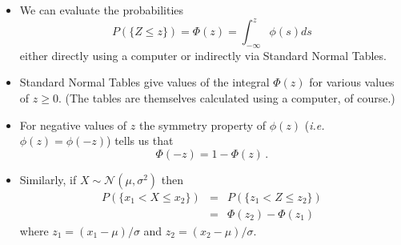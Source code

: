 \documentclass[notes=show,smaller,handout]{beamer}\usepackage[]{graphicx}\usepackage[]{color}
\renewcommand{\Pr}{P}
\newcommand{\N}{\mathcal{N}}
\newenvironment{stepitemize}{\begin{itemize}[<+->]}{\end{itemize} }
\begin{document}
\begin{frame}{\subsecname}


\begin{stepitemize}
\item We can evaluate the probabilities
$$
\Pr(\{Z\leq z\})=\Phi(z)=\int_{-\infty}^z\phi(s)ds
$$
either directly using a computer or indirectly via Standard Normal
Tables.
\item Standard Normal Tables give values of the integral $\Phi(z)$ for various values of $z\geq 0$. (The tables are themselves
calculated using a computer, of course.)
\item For negative values of $z$ the symmetry property of $\phi(z)$ (\textit{i.e.} $\phi(z)=\phi(-z)$) tells us that
$$
\Phi(-z)=1-\Phi(z)\,.
$$
\item Similarly, if $X\sim \N\left( \mu ,\sigma ^{2}\right) $ then
\begin{eqnarray*}
\Pr(\{x_1<X\leq x_2\})&=&\Pr(\{z_1<Z\leq z_2\})\\
 &=&\Phi(z_2)-\Phi(z_1)
 \end{eqnarray*}
where $z_1=(x_1-\mu)/\sigma$ and $z_2=(x_2-\mu)/\sigma$.

\end{stepitemize}

\end{frame}%
\end{document}
